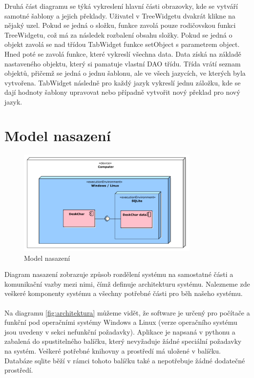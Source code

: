 \documentclass[thesis=B,czech]{resources/FITthesis}[2012/06/26]
\begin{document}
Druhá část diagramu se týká vykreslení hlavní části obrazovky, kde se vytváří samotné šablony a jejich překlady. Uživatel v TreeWidgetu dvakrát klikne na nějaký uzel. Pokud se jedná o složku, funkce zavolá pouze rodičovskou funkci TreeWidgetu, což má za následek rozbalení obsahu složky. Pokud se jedná o objekt zavolá se nad třídou TabWidget funkce setObject s parametrem object. Hned poté se zavolá funkce, které vykreslí všechna data. Data získá na základě nastaveného objektu, který si pamatuje vlastní DAO třídu. Třída vrátí seznam objektů, přičemž se jedná o jednu šablonu, ale ve všech jazycích, ve kterých byla vytvořena. TabWidget následně pro každý jazyk vykreslí jednu záložku, kde se dají hodnoty šablony upravovat nebo případně vytvořit nový překlad pro nový jazyk.
	
	\section{Model nasazení}
	\begin{figure}\centering
	\includegraphics[width=0.8\textwidth]{images/model_nasazeni}
	\caption[Model nasazení]{Model nasazení}\label{fig:model_nasazeni}
	\end{figure}
Diagram nasazení zobrazuje způsob rozdělení systému na samostatné části a komunikační vazby mezi nimi, čímž definuje architekturu systému. Nalezneme zde veškeré komponenty systému a všechny potřebné části pro běh našeho systému.\\
\\
Na diagramu \ref{fig:architektura} můžeme vidět, že software je určený pro počítače a funkční pod operačními systémy Windows a Linux (verze operačního systému jsou uvedeny v sekci nefunkční požadavky). Aplikace je napsaná v pythonu a zabalená do spustitelného balíčku, který nevyžaduje žádné speciální požadavky na systém. Veškeré potřebné knihovny a prostředí má uložené v balíčku. Databáze sqlite běží v rámci tohoto balíčku také a nepotřebuje žádné dodatečné prostředí.
\end{document}
